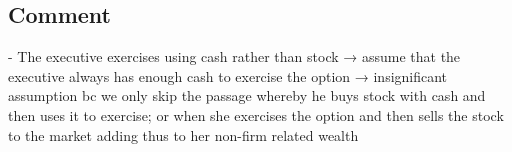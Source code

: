 
\subsection*{Comment}


- The executive exercises using cash rather than stock
    → assume that the executive always has enough cash to exercise the option
    → insignificant assumption bc we only skip the passage whereby he buys stock with cash and then uses it to exercise; or when she exercises the option and then sells the stock to the market adding thus to her non-firm related wealth



